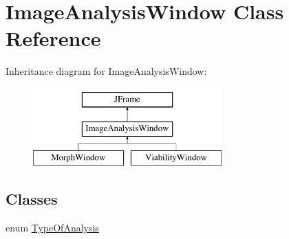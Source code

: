 \hypertarget{classgui_1_1_image_analysis_window}{}\section{Image\+Analysis\+Window Class Reference}
\label{classgui_1_1_image_analysis_window}
Inheritance diagram for Image\+Analysis\+Window\+:\begin{figure}[H]
\begin{center}
\leavevmode
\includegraphics[height=3.000000cm]{classgui_1_1_image_analysis_window}
\end{center}
\end{figure}
\subsection*{Classes}
\begin{DoxyCompactItemize}
\item 
enum \hyperlink{enumgui_1_1_image_analysis_window_1_1_type_of_analysis}{Type\+Of\+Analysis}
\end{DoxyCompactItemize}
